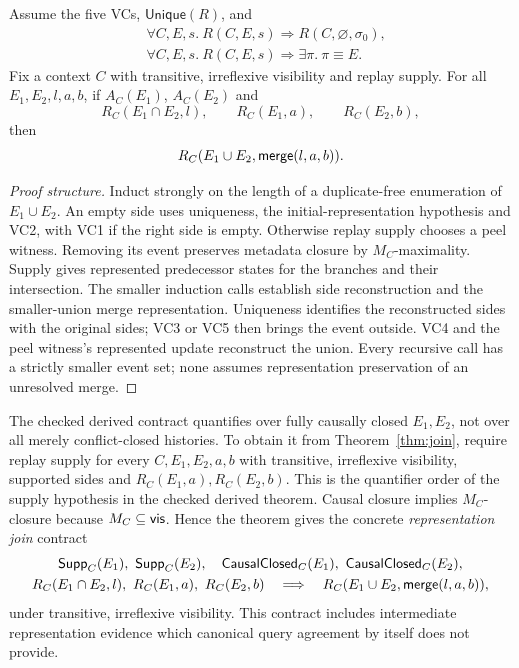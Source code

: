\begin{theorem}\label{thm:join}
Assume the five VCs, $\mathsf{Unique}(R)$, and
\[
\begin{aligned}
 &\forall C,E,s.\ R(C,E,s)\Longrightarrow R(C,\varnothing,\sigma_0),\\
 &\forall C,E,s.\ R(C,E,s)\Longrightarrow\exists\pi.\ \pi\equiv E.
\end{aligned}
\]
Fix a context $C$ with transitive, irreflexive visibility and replay supply.
For all $E_1,E_2,l,a,b$, if $A_C(E_1)$, $A_C(E_2)$ and
\[
 R_C(E_1\cap E_2,l),\qquad R_C(E_1,a),\qquad R_C(E_2,b),
\]
then
\[
 R_C(E_1\cup E_2,\mathsf{merge}(l,a,b)).
\]
\end{theorem}
\begin{proof}[Proof structure]
Induct strongly on the length of a duplicate-free enumeration of
$E_1\cup E_2$. An empty side uses uniqueness, the initial-representation
hypothesis and VC2, with VC1 if the right side is empty. Otherwise replay
supply chooses a peel witness. Removing its event preserves metadata closure
by $M_C$-maximality. Supply gives represented predecessor states for the
branches and their intersection. The smaller induction calls establish
side reconstruction and the smaller-union merge representation. Uniqueness
identifies the reconstructed sides with the original sides; VC3 or VC5
then brings the event outside. VC4 and the peel witness's represented update
reconstruct the union. Every recursive call has a strictly smaller event
set; none assumes representation preservation of an unresolved merge.
\end{proof}

\begin{remark}
The checked derived contract quantifies over fully causally closed
$E_1,E_2$, not over all merely conflict-closed histories. To obtain it from
Theorem~\ref{thm:join}, require replay supply for every $C,E_1,E_2,a,b$
with transitive, irreflexive visibility, supported sides and
$R_C(E_1,a),R_C(E_2,b)$. This is the quantifier order of the supply hypothesis
in the checked derived theorem. Causal closure implies $M_C$-closure because
$M_C\subseteq\mathsf{vis}$. Hence the theorem gives the concrete
\emph{representation join} contract
\[
\begin{gathered}
 \mathsf{Supp}_C(E_1),\ \mathsf{Supp}_C(E_2),\quad
 \mathsf{CausalClosed}_C(E_1),\ \mathsf{CausalClosed}_C(E_2),\\
 R_C(E_1\cap E_2,l),\ R_C(E_1,a),\ R_C(E_2,b)
 \quad\Longrightarrow\quad R_C(E_1\cup E_2,\mathsf{merge}(l,a,b)),
\end{gathered}
\]
under transitive, irreflexive visibility. This contract includes intermediate
representation evidence which canonical query agreement by itself does not
provide.
\end{remark}

